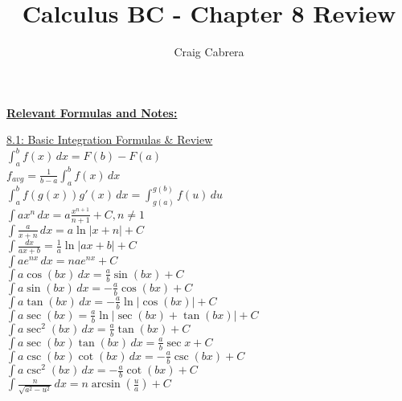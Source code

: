 \documentclass[10pt,a5paper]{report}
\title{Calculus BC - Chapter 8 Review}
\author{Craig Cabrera}
\date{}
\begin{document}
\begin{center}
  \textbf{\underline{Relevant Formulas and Notes:}}
\end{center}

\begin{multicols*}{2}
	\underline{8.1: Basic Integration Formulas \& Review} \\
	
	$\int_{a}^{b}{f(x)}\,dx=F(b)-F(a)$ \\
	
	$f_{avg}=\frac{1}{b-a}{\int_{a}^{b}{f(x)}\,dx}$ \\
	
	$\int_{a}^{b}{f(g(x))g'(x)}\,dx=\int_{g(a)}^{g(b)}{f(u)}\,du$ \\

	$\int{ax^{n}}\,dx=a\frac{x^{n+1}}{n+1}+C, n\neq 1$ \\

	$\int{\frac{a}{x+n}}\,dx=a\ln{\left|x+n\right|}+C$ \\

	$\int{\frac{dx}{ax+b}}=\frac{1}{a}\ln{\left|ax+b\right|}+C$ \\

	$\int{ae^{nx}}\,dx=nae^{nx}+C$ \\

	$\int{a\cos{(bx)}}\,dx=\frac{a}{b}\sin{(bx)}+C$ \\ 

	$\int{a\sin{(bx)}}\,dx=-\frac{a}{b}\cos{(bx)}+C$ \\

	$\int{a\tan{(bx)}}\,dx=-\frac{a}{b}\ln{\left|\cos{(bx)}\right|}+C$ \\

	$\int{a\sec{(bx)}}=\frac{a}{b}\ln{\left|\sec{(bx)}+\tan{(bx)}\right|}+C$ \\

	$\int{a\sec^{2}{(bx)}}\,dx=\frac{a}{b}\tan{(bx)}+C$ \\

	$\int{a\sec{(bx)}\tan{(bx)}}\,dx=\frac{a}{b}\sec{x}+C$ \\

	$\int{a\csc{(bx)}\cot{(bx)}}\,dx=-\frac{a}{b}\csc{(bx)}+C$ \\

	$\int{a\csc^{2}{(bx)}}\,dx=-\frac{a}{b}\cot{(bx)}+C$ \\
	
	$\int{\frac{n}{\sqrt{a^{2}-u^{2}}}}\,dx=n\arcsin{\left(\frac{u}{a}\right)}+C$ \\
	

\end{multicols*}
\end{document}
